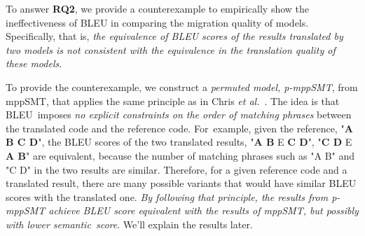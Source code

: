 To answer {\bf RQ2}, we provide a counterexample to empirically show the 
ineffectiveness of BLEU in comparing the migration quality of models. 
%
Specifically, that is, {\em the equivalence of BLEU scores of the results translated 
by two models is not consistent with the equivalence in the translation quality 
of these models}.
%

To provide the counterexample, we construct a {\em permuted model,
  p-mppSMT}, from mppSMT, that applies the same principle as
in Chris {\em et al.}~\cite{Callison}. The idea is that BLEU~imposes
{\em no explicit constraints on the order of matching phrases} between the
translated code and the reference code. For~example, given the reference, 
"\textbf{A B C D}", the BLEU scores of the two translated results, 
"\textbf{A B} E \textbf{C D}", "\textbf{C D} E \textbf{A B}" 
are equivalent, because the number of matching phrases such as "A B" and "C D" 
in the two results are similar. Therefore, for a given reference code and 
a translated result, there are many possible variants that would have 
similar BLEU scores with the translated one. {\em By following that 
principle, the results from p-mppSMT achieve BLEU score equivalent 
with the results of mppSMT, but possibly with lower semantic~score}. We'll explain the results later.

%

